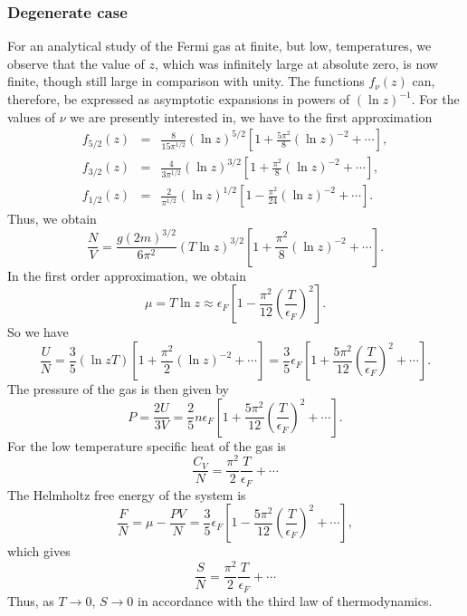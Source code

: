 \subsubsection{Degenerate case}
For an analytical study of the Fermi gas at finite, but low, temperatures, we observe that the value of $z$, which was infinitely large at absolute zero, is now finite, though still large in comparison with unity. 
The functions $f_{\nu}(z)$ can, therefore, be expressed as asymptotic expansions in powers of $(\ln z)^{-1}$.
For the values of $\nu$ we are presently interested in, we have to the first approximation
\begin{eqnarray}
f_{5/2}(z) &=& \frac{8}{15\pi^{1/2}} (\ln z)^{5/2} \left[ 1 + \frac{5\pi^2}{8}(\ln z)^{-2} + \cdots \right], \nonumber \\
f_{3/2}(z) &=& \frac{4}{3\pi^{1/2}} (\ln z)^{3/2} \left[ 1 + \frac{\pi^2}{8}(\ln z)^{-2} + \cdots \right] ,\nonumber \\
f_{1/2}(z) &=& \frac{2}{\pi^{1/2}} (\ln z)^{1/2} \left[ 1 - \frac{\pi^2}{24}(\ln z)^{-2} + \cdots \right] .\nonumber
\end{eqnarray}
Thus, we obtain
\[\frac{N}{V} = \frac{g(2m)^{3/2}}{6\pi^2} (T\ln z)^{3/2} \left[ 1 + \frac{\pi^2}{8}(\ln z)^{-2} + \cdots \right] .\]
In the first order approximation, we obtain
\[\mu = T\ln z \approx \epsilon_F \left[ 1 - \frac{\pi^2}{12} \left( \frac{T}{\epsilon_F} \right)^2 \right].\]
So we have
\[\frac{U}{N} = \frac{3}{5} (\ln z T) \left[ 1 + \frac{\pi^2}{2}(\ln z)^{-2} + \cdots \right] = \frac{3}{5}\epsilon_F \left[ 1 + \frac{5\pi^2}{12}\left( \frac{T}{\epsilon_F} \right)^2 + \cdots \right].\]
The pressure of the gas is then given by
\[P = \frac{2U}{3V} = \frac{2}{5}n\epsilon_F\left[ 1 + \frac{5\pi^2}{12}\left( \frac{T}{\epsilon_F} \right)^2 + \cdots \right] .\]
For the low temperature specific heat of the gas is
\[\frac{C_V}{N} = \frac{\pi^2}{2} \frac{T}{\epsilon_F} + \cdots\]
The Helmholtz free energy of the system is
\[\frac{F}{N} = \mu - \frac{PV}{N} = \frac{3}{5}\epsilon_F\left[ 1 - \frac{5\pi^2}{12}\left( \frac{T}{\epsilon_F} \right)^2 + \cdots \right] ,\]
which gives
\[\frac{S}{N} = \frac{\pi^2}{2}\frac{T}{\epsilon_F} + \cdots\]
Thus, as $T \to 0$, $S \to 0$ in accordance with the third law of thermodynamics.

